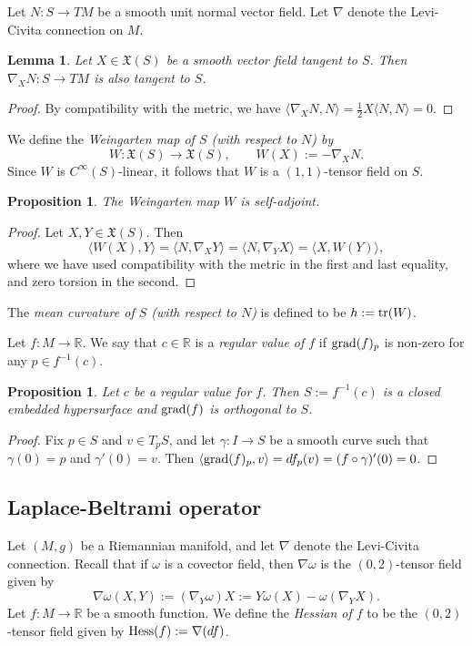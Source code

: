\documentclass{amsart}
\newcommand{\R}{\mathbb R}
\newcommand{\grad}{\text{\normalfont grad}}
\newcommand{\hess}{\text{\normalfont Hess}}
\newcommand{\tr}{\text{\normalfont tr}}
\theoremstyle{plain}
\newtheorem{proposition}[theorem]{Proposition}
\newtheorem{lemma}[theorem]{Lemma}
\theoremstyle{definition}
\theoremstyle{remark}
\begin{document}
	
	
	Let $N:S \rightarrow TM$ be a smooth unit normal vector field. 
	Let $\nabla$ denote the Levi-Civita connection on $M$. 
	
	\begin{lemma}
		Let $X \in \mathfrak X(S)$ be a smooth vector field tangent to $S$. Then $\nabla_X N:S \rightarrow TM$ is also tangent to $S$.
	\end{lemma}
	\begin{proof}
		By compatibility with the metric, we have $\langle \nabla_X N,N \rangle = \frac12 X \langle N,N \rangle = 0$.
	\end{proof}

	We define the \emph{Weingarten map of $S$ (with respect to $N$) by} $$W:\mathfrak X(S) \rightarrow \mathfrak X(S),\qquad W(X) := - \nabla_X N.$$
	Since $W$ is $C^\infty(S)$-linear, it follows that $W$ is a $(1,1)$-tensor field on $S$.
	
	\begin{proposition}
		The Weingarten map $W$ is self-adjoint.
	\end{proposition}
	\begin{proof}
		Let $X,Y \in \mathfrak X(S)$. Then 
		$$\langle W(X), Y \rangle = \langle N, \nabla_X Y \rangle = \langle N, \nabla_Y X \rangle = \langle X, W(Y) \rangle,$$
		where we have used compatibility with the metric in the first and last equality, and zero torsion in the second.
	\end{proof}
	The \emph{mean curvature of $S$ (with respect to $N$)} is defined to be $h := \tr(W)$.
	
	
	Let $f:M \rightarrow \R$. We say that $c \in \R$ is a \emph{regular value of $f$} if $\grad(f)_p$ is non-zero for any $p \in f^{-1}(c)$.
	\begin{proposition}
		Let $c$ be a regular value for $f$. Then $S  := f^{-1}(c)$ is a closed embedded hypersurface and $\grad(f)$ is orthogonal to $S$.
	\end{proposition}
	\begin{proof}
		Fix $p \in S$ and $v \in T_p S$, and let $\gamma:I \rightarrow S$ be a smooth curve such that $\gamma(0) = p$ and $\gamma'(0) = v$. Then $\langle \grad(f)_p, v \rangle = df_p(v) = (f \circ \gamma)'(0) = 0$.
	\end{proof}
	\subsection{Laplace-Beltrami operator}
	Let $(M,g)$ be a Riemannian manifold, and let $\nabla$ denote the Levi-Civita connection. Recall that if $\omega$ is a covector field, then $\nabla \omega$ is the $(0,2)$-tensor field given by 
	$$\nabla \omega(X,Y) := (\nabla_Y \omega )X := Y \omega(X) - \omega(\nabla_Y X).$$
	Let $f:M \rightarrow \R$ be a smooth function. We define the \emph{Hessian of $f$} to be the $(0,2)$-tensor field given by $\hess(f) := \nabla(df)$.
	
\end{document}
